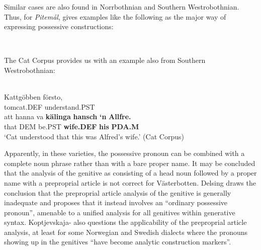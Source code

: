 \ea
{}
\z 
\z

Similar cases are also found in Norrbothnian and Southern Westrobothnian. Thus, for \textit{Pitemål}, \citet{Brännström1993} gives examples like the following as the major way of expressing possessive constructions:

\ea\label{}
\\

\z 
\z

The Cat Corpus provides us with an example also from Southern Westrobothnian:


\ea\label{}
\\
\gll Kattgöbben  försto,\\
tomcat.DEF  understand.PST\\
\gll att  hanna  va  \textbf{kälinga} \textbf{hansch} \textbf{‘n} \textbf{Allfre.}\\
that  DEM  be.PST  \textbf{wife.DEF} \textbf{his} \textbf{PDA.M} \\
\glt ‘Cat understood that this was Alfred’s wife.’ (Cat Corpus)
\z

Apparently, in these varieties, the possessive pronoun can be combined with a complete noun phrase rather than with a bare proper name. It may be concluded that the analysis of the genitive as consisting of a head noun followed by a proper name with a preproprial article is not correct for Västerbotten.  Delsing draws the conclusion that the preproprial article analysis of the genitive is generally inadequate and proposes that it instead involves an “ordinary possessive pronoun”, amenable to a unified analysis for all genitives within generative syntax. Koptjevskaja-\citet{Tamm2003} also questions the applicability of the preproprial article analysis, at least for some Norwegian and Swedish dialects where the pronouns showing up in the genitives “have become analytic construction markers”. 

